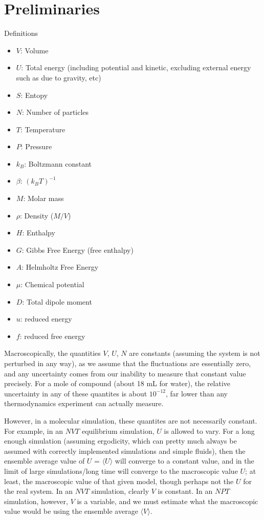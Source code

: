 \documentclass[aps,pre,twocolumn,nofootinbib,superscriptaddress,linenumbers,10pt, draft,tightenlines]{revtex4-1}
\newcounter{comment}
\newcommand{\comment}[2][]{%
\refstepcounter{comment}%
{%
\setstretch{0.7}%
\todo[inline, color={cyan!45},size=\small]{%
\textbf{\footnotesize [\uppercase{#1}\thecomment]:}~#2}%
}}
\begin{document}
\section{Preliminaries}
Definitions
\begin{itemize}
\item $V$: Volume
\item $U$: Total energy (including potential and kinetic, excluding external energy such as due to gravity, etc)
\item $S$: Entopy
\item $N$: Number of particles
\item $T$: Temperature
\item $P$: Pressure
\item $k_B$: Boltzmann constant
\item $\beta$: $(k_B T)^{-1}$
\item $M$: Molar mass
\item $\rho$: Density ($M/V$)
\item $H$: Enthalpy 
\item $G$: Gibbs Free Energy (free enthalpy)
\item $A$: Helmholtz Free Energy
\item $\mu$: Chemical potential
\item $D$: Total dipole moment
\item $u$: reduced energy
\item $f$: reduced free energy
\end{itemize}

Macroscopically, the quantities $V$, $U$, $N$ are constants (assuming
the system is not perturbed in any way), as we assume that the
fluctuations are essentially zero, and any uncertainty comes from our
inability to measure that constant value precisely. For a mole of
compound (about 18 mL for water), the relative uncertainty in any of
these quantites is about $10^{-12}$, far lower than any thermodynamics
experiment can actually measure.


However, in a molecular simulation, these quantites are not
necessarily constant. For example, in an $NVT$ equilibrium simulation,
$U$ is allowed to vary. For a long enough simulation (assuming
ergodicity, which can pretty much always be assumed with correctly
implemented simulations and simple fluids), then the ensemble average
value of $U$ = $\langle U \rangle$ will converge to a constant value,
and in the limit of large simulations/long time will converge to the
macroscopic value $U$; at least, the macroscopic value of that given
model, though perhaps not the $U$ for the real system. In an $NVT$
simulation, clearly $V$ is constant.  In an $NPT$ simulation, however,
$V$ is a variable, and we must estimate what the macroscopic value
would be using the ensemble average $\langle V \rangle$.
\end{document}
